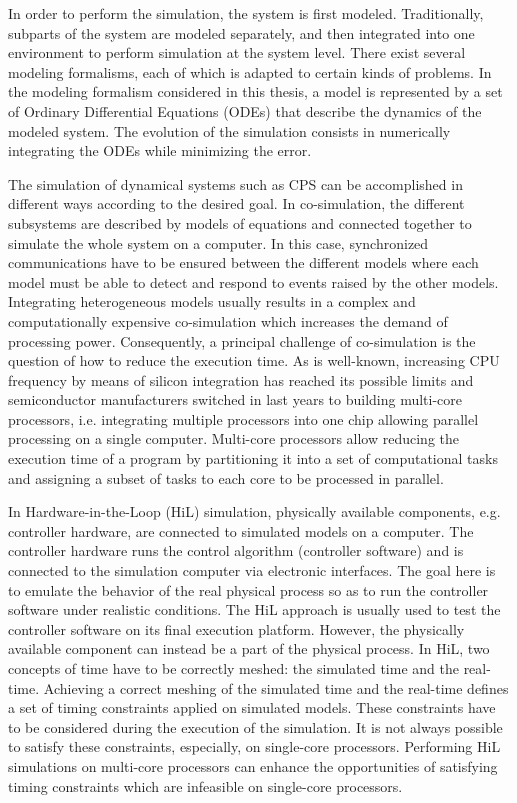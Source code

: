In order to perform the simulation, the system is first modeled. Traditionally, subparts of the system are modeled separately, and then integrated into one environment to perform simulation at the system level. There exist several modeling formalisms, each of which is adapted to certain kinds of problems. In the modeling formalism considered in this thesis, a model is represented by a set of Ordinary Differential Equations (ODEs) that describe the dynamics of the modeled system. The evolution of the simulation consists in numerically integrating the ODEs while minimizing the error.

The simulation of dynamical systems such as CPS can be accomplished in different ways according to the desired goal. In co-simulation, the different subsystems are described by models of equations and connected together to simulate the whole system on a computer. In this case, synchronized communications have to be ensured between the different models where each model must be able to detect and respond to events raised by the other models. Integrating heterogeneous models usually results in a complex and computationally expensive co-simulation which increases the demand of processing power. Consequently, a principal challenge of co-simulation is the question of how to reduce the execution time. As is well-known, increasing CPU frequency by means of silicon integration has reached its possible limits and semiconductor manufacturers switched in last years to building multi-core processors, i.e. integrating multiple processors into one chip allowing parallel processing on a single computer. Multi-core processors allow reducing the execution time of a program by partitioning it into a set of computational tasks and assigning a subset of tasks to each core to be processed in parallel.

In Hardware-in-the-Loop (HiL) simulation, physically available components, e.g. controller hardware, are connected to simulated models on a computer. The controller hardware runs the control algorithm (controller software) and is connected to the simulation computer via electronic interfaces. The goal here is to emulate the behavior of the real physical process so as to run the controller software under realistic conditions. The HiL approach is usually used to test the controller software on its final execution platform. However, the physically available component can instead be a part of the physical process. In HiL, two concepts of time have to be correctly meshed: the simulated time and the real-time. %
Achieving a correct meshing of the simulated time and the real-time defines a set of timing constraints applied on simulated models. These constraints have to be considered during the execution of the simulation. It is not always possible to satisfy these constraints, especially, on single-core processors. Performing HiL simulations on multi-core processors can enhance the opportunities of satisfying timing constraints which are infeasible on single-core processors.

